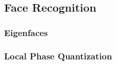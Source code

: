 \lipsum[10]

\subsection{Face Recognition}
\label{sub:FaceRecognition}


\subsubsection{Eigenfaces}
\label{subs:Eigenfaces}


\subsubsection{Local Phase Quantization}
\label{subs:LocalPhaseQuantization}

